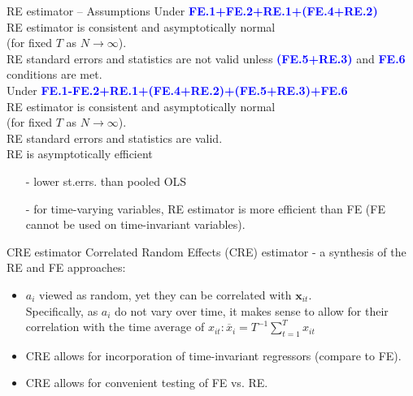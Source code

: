 \documentclass[usenames,dvipsnames]{beamer}
\begin{document}
\begin{frame}{RE estimator – Assumptions}
Under  \textcolor{blue}{\textbf{FE.1+FE.2+RE.1+(FE.4+RE.2)}}\\
RE estimator is consistent and asymptotically normal \\(for fixed $T$ as $N \rightarrow \infty$).\\
RE standard errors and statistics are not valid unless \textcolor{blue}{\textbf{(FE.5+RE.3)}} and  \textcolor{blue}{\textbf{FE.6}} conditions are met.\\
\bigskip
Under  \textcolor{blue}{\textbf{FE.1-FE.2+RE.1+(FE.4+RE.2)+(FE.5+RE.3)+FE.6}}\\
RE estimator is consistent and asymptotically normal \\(for fixed $T$ as $N \rightarrow \infty$).\\
RE standard errors and statistics are valid.\\
RE is asymptotically efficient 
\begin{itemize}
\item[-] lower st.errs. than pooled OLS
\item[-] for time-varying variables, RE estimator is more efficient than FE (FE cannot be used on time-invariant variables).
\end{itemize}
\end{frame}
\begin{frame}{CRE estimator}
Correlated Random Effects (CRE) estimator - a synthesis of the RE and FE approaches: 
\vspace{0.5cm}
\begin{itemize}
\item $a_i$ viewed as random, yet they can be correlated with $\bm{x}_{it}$.\\
\vspace{0.2cm}
Specifically, as $a_i$ do not vary over time, it makes sense to allow for their correlation with the time average of $x_{it}:\overline{x}_i = T^{-1} \sum^T_{t=1}x_{it}$
\vspace{0.2cm}
\item CRE allows for incorporation of time-invariant regressors (compare to FE).
\vspace{0.2cm}
\item CRE allows for convenient testing of FE vs. RE.
\end{itemize}
\end{frame}
\end{document}
